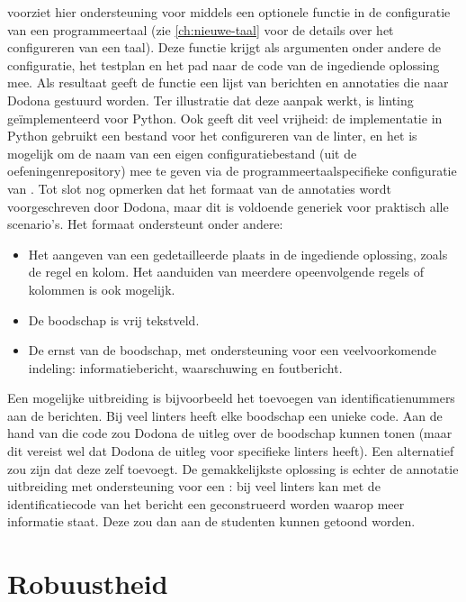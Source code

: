 \tested{} voorziet hier ondersteuning voor middels een optionele functie in de configuratie van een programmeertaal (zie \cref{ch:nieuwe-taal} voor de details over het configureren van een taal).
Deze functie krijgt als argumenten onder andere de configuratie, het testplan en het pad naar de code van de ingediende oplossing mee.
Als resultaat geeft de functie een lijst van berichten en annotaties die naar Dodona gestuurd worden.
Ter illustratie dat deze aanpak werkt, is linting geïmplementeerd voor Python.
Ook geeft dit veel vrijheid: de implementatie in Python gebruikt een bestand voor het configureren van de linter, en het is mogelijk om de naam van een eigen configuratiebestand (uit de oefeningenrepository) mee te geven via de programmeertaalspecifieke configuratie van \tested{}.
Tot slot nog opmerken dat het formaat van de annotaties wordt voorgeschreven door Dodona, maar dit is voldoende generiek voor praktisch alle scenario's.
Het formaat ondersteunt onder andere:

\begin{itemize}
    \item Het aangeven van een gedetailleerde plaats in de ingediende oplossing, zoals de regel en kolom.
    Het aanduiden van meerdere opeenvolgende regels of kolommen is ook mogelijk.
    \item De boodschap is vrij tekstveld.
    \item De ernst van de boodschap, met ondersteuning voor een veelvoorkomende indeling: informatiebericht, waarschuwing en foutbericht.
\end{itemize}

Een mogelijke uitbreiding is bijvoorbeeld het toevoegen van identificatienummers aan de berichten.
Bij veel linters heeft elke boodschap een unieke code.
Aan de hand van die code zou Dodona de uitleg over de boodschap kunnen tonen (maar dit vereist wel dat Dodona de uitleg voor specifieke linters heeft).
Een alternatief zou zijn dat \tested{} deze zelf toevoegt.
De gemakkelijkste oplossing is echter de annotatie uitbreiding met ondersteuning voor een : bij veel linters kan met de identificatiecode van het bericht een  geconstrueerd worden waarop meer informatie staat.
Deze  zou dan aan de studenten kunnen getoond worden.

\section{Robuustheid}\label{sec:robuustheid}

